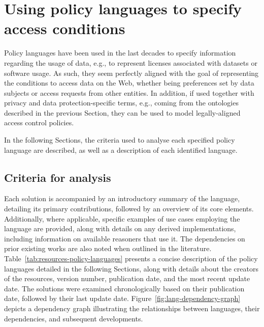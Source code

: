 \section{Using policy languages to specify access conditions}
\label{sec:sota_policies}

Policy languages have been used in the last decades to specify information regarding the usage of data, e.g., to represent licenses associated with datasets or software usage.
As such, they seem perfectly aligned with the goal of representing the conditions to access data on the Web, whether being preferences set by data subjects or access requests from other entities.
In addition, if used together with privacy and data protection-specific terms, e.g., coming from the ontologies described in the previous Section, they can be used to model legally-aligned access control policies.

In the following Sections, the criteria used to analyse each specified policy language are described, as well as a description of each identified language.

\subsection{Criteria for analysis}
\label{sec:sota_policies_criteria}

Each solution is accompanied by an introductory summary of the language, detailing its primary contributions, followed by an overview of its core elements.
Additionally, where applicable, specific examples of use cases employing the language are provided, along with details on any derived implementations, including information on available reasoners that use it.
The dependencies on prior existing works are also noted when outlined in the literature.
Table~\ref{tab:resources-policy-languages} presents a concise description of the policy languages detailed in the following Sections, along with details about the creators of the resources, version number, publication date, and the most recent update date.
The solutions were examined chronologically based on their publication date, followed by their last update date.
Figure~\ref{fig:lang-dependency-graph} depicts a dependency graph illustrating the relationships between languages, their dependencies, and subsequent developments.

